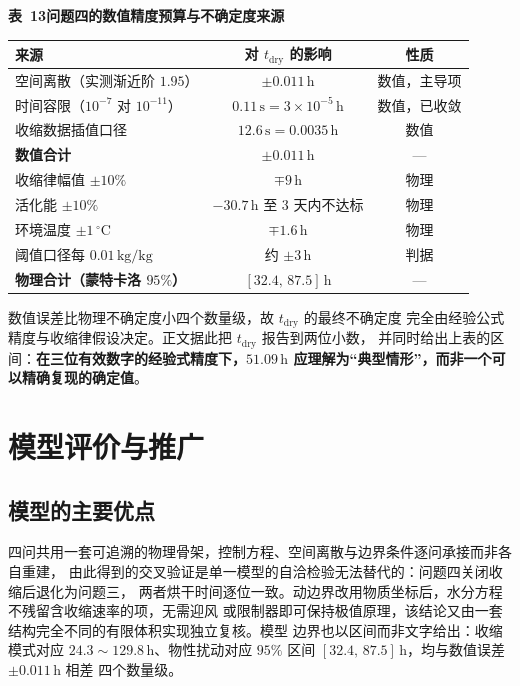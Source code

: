 \documentclass[withoutpreface,bwprint]{cumcmthesis} %
\begin{document}
\begin{table}[htbp]
\centering
\begin{minipage}{0.94\textwidth}
\centering\small
\textbf{表~13\quad 问题四的数值精度预算与不确定度来源}\\[3pt]
\begin{tabular}{lcc}
\toprule
来源 & 对 $t_{\mathrm{dry}}$ 的影响 & 性质 \\
\midrule
空间离散（实测渐近阶 $1.95$） & $\pm0.011\,\mathrm{h}$ & 数值，主导项 \\
时间容限（$10^{-7}$ 对 $10^{-11}$） & $0.11\,\mathrm{s}=3\times10^{-5}\,\mathrm{h}$ & 数值，已收敛 \\
收缩数据插值口径 & $12.6\,\mathrm{s}=0.0035\,\mathrm{h}$ & 数值 \\
\textbf{数值合计} & $\mathbf{\pm0.011\,\mathrm{h}}$ & — \\
\addlinespace
收缩律幅值 $\pm10\%$ & $\mp9\,\mathrm{h}$ & 物理 \\
活化能 $\pm10\%$ & $-30.7\,\mathrm{h}$ 至 $3$ 天内不达标 & 物理 \\
环境温度 $\pm1\,^\circ\mathrm{C}$ & $\mp1.6\,\mathrm{h}$ & 物理 \\
阈值口径每 $0.01\,\mathrm{kg/kg}$ & 约 $\pm3\,\mathrm{h}$ & 判据 \\
\textbf{物理合计（蒙特卡洛 $95\%$）} & $\mathbf{[32.4,\,87.5]\,\mathrm{h}}$ & — \\
\bottomrule
\end{tabular}
\end{minipage}
\end{table}

\noindent 数值误差比物理不确定度小四个数量级，故 $t_{\mathrm{dry}}$ 的最终不确定度
完全由经验公式精度与收缩律假设决定。正文据此把 $t_{\mathrm{dry}}$ 报告到两位小数，
并同时给出上表的区间：\textbf{在三位有效数字的经验式精度下，$51.09\,\mathrm{h}$
应理解为“典型情形”，而非一个可以精确复现的确定值}。

\section{模型评价与推广}

\subsection{模型的主要优点}

四问共用一套可追溯的物理骨架，控制方程、空间离散与边界条件逐问承接而非各自重建，
由此得到的交叉验证是单一模型的自洽检验无法替代的：问题四关闭收缩后退化为问题三，
两者烘干时间逐位一致。动边界改用物质坐标后，水分方程不残留含收缩速率的项，无需迎风
或限制器即可保持极值原理，该结论又由一套结构完全不同的有限体积实现独立复核。模型
边界也以区间而非文字给出：收缩模式对应 $24.3\sim129.8\,\mathrm{h}$、物性扰动对应
$95\%$ 区间 $[32.4,\,87.5]\,\mathrm{h}$，均与数值误差 $\pm0.011\,\mathrm{h}$ 相差
四个数量级。
\end{document}
